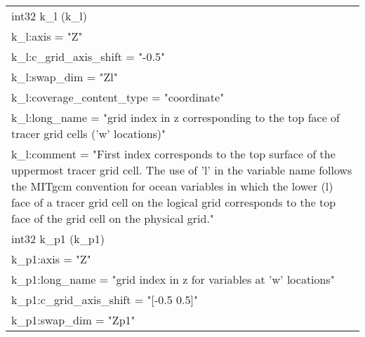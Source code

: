 \begin{longtable}{|p{\textwidth}|}
\rowcolor{Apricot}\hspace{0.5cm}int32 k\_l (k\_l)\\
\rowcolor{Apricot}\hspace{0.5cm}\hspace{0.5cm}k\_l:axis = "Z"\\
\rowcolor{Apricot}\hspace{0.5cm}\hspace{0.5cm}k\_l:c\_grid\_axis\_shift = "-0.5"\\
\rowcolor{Apricot}\hspace{0.5cm}\hspace{0.5cm}k\_l:swap\_dim = "Zl"\\
\rowcolor{Apricot}\hspace{0.5cm}\hspace{0.5cm}k\_l:coverage\_content\_type = "coordinate"\\
\rowcolor{Apricot}\hspace{0.5cm}\hspace{0.5cm}k\_l:long\_name = "grid index in z corresponding to the top face of tracer grid cells ('w' locations)"\\
\rowcolor{Apricot}\hspace{0.5cm}\hspace{0.5cm}k\_l:comment = "First index corresponds to the top surface of the uppermost tracer grid cell. The use of 'l' in the variable name follows the MITgcm convention for ocean variables in which the lower (l) face of a tracer grid cell on the logical grid corresponds to the top face of the grid cell on the physical grid."\\
\rowcolor{Apricot}\hspace{0.5cm}int32 k\_p1 (k\_p1)\\
\rowcolor{Apricot}\hspace{0.5cm}\hspace{0.5cm}k\_p1:axis = "Z"\\
\rowcolor{Apricot}\hspace{0.5cm}\hspace{0.5cm}k\_p1:long\_name = "grid index in z for variables at 'w' locations"\\
\rowcolor{Apricot}\hspace{0.5cm}\hspace{0.5cm}k\_p1:c\_grid\_axis\_shift = "[-0.5  0.5]"\\
\rowcolor{Apricot}\hspace{0.5cm}\hspace{0.5cm}k\_p1:swap\_dim = "Zp1"\\

\end{longtable}
